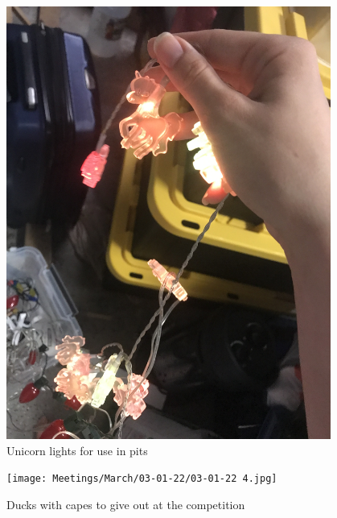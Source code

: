 \begin{figure}[htp]
\centering
\includegraphics[width=0.95\textwidth, angle=0]{Meetings/March/03-01-22/03-01-22 3.jpg}
\caption{Unicorn lights for use in pits}
\label{fig:030122_3}
\end{figure}

\begin{figure}[htp]
\centering
\texttt{[image: Meetings/March/03-01-22/03-01-22 4.jpg]}
\caption{Ducks with capes to give out at the competition}
\label{fig:030122_4}
\end{figure}



